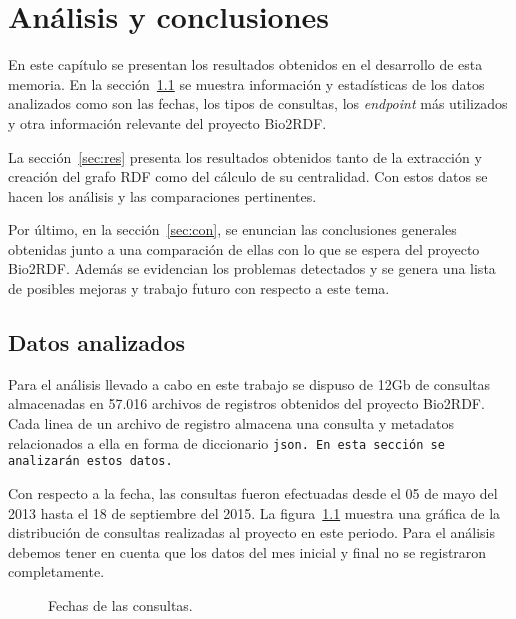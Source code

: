 \chapter{Análisis y conclusiones}
En este capítulo se presentan los resultados obtenidos en el desarrollo de esta
memoria.
En la sección~\ref{sec:datos} se muestra información y estadísticas de los datos
analizados como son las fechas, los tipos de consultas, los \emph{endpoint} más
utilizados y otra información relevante del proyecto Bio2RDF.

La sección~\ref{sec:res} presenta los resultados obtenidos tanto de la
extracción y creación del grafo RDF como del cálculo de su centralidad. Con
estos datos se hacen los análisis y las comparaciones pertinentes.

Por último, en la sección~\ref{sec:con}, se enuncian las conclusiones generales
obtenidas junto a una comparación de ellas con lo que se espera del proyecto
Bio2RDF. Además se evidencian los problemas detectados y se genera una lista de
posibles mejoras y trabajo futuro con respecto a este tema.


\section{Datos analizados}\label{sec:datos}
Para el análisis llevado a cabo en este trabajo se dispuso de 12Gb de consultas
almacenadas en 57.016 archivos de registros obtenidos del proyecto Bio2RDF.
Cada linea de un archivo de registro almacena una consulta y metadatos 
relacionados a ella en forma de diccionario \tt{json}. En esta sección se
analizarán estos datos.

Con respecto a la fecha, las consultas fueron efectuadas desde el 05 de mayo del
2013 hasta el 18 de septiembre del 2015.
La figura~\ref{fig:dates} muestra una gráfica de la distribución de consultas
realizadas al proyecto en este periodo.
Para el análisis debemos tener en cuenta que los datos del mes inicial y final
no se registraron completamente.

\begin{figure}[ht]
  \caption{Fechas de las consultas.}\label{fig:dates}
\end{figure}

